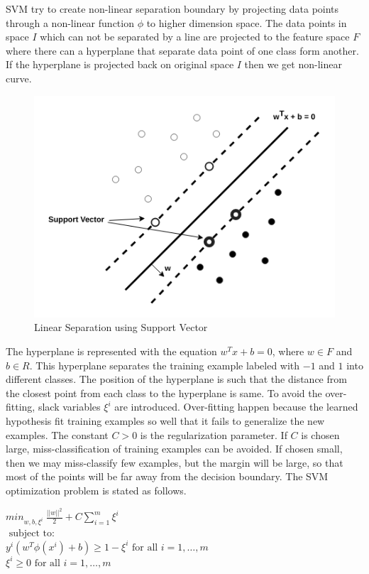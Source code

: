 \documentclass[12pt,oneside,a4paper]{article}
\begin{document}
SVM try to create non-linear separation boundary by projecting data points through a non-linear function $\phi$ to higher dimension space. The data points in space $I$ which can not be separated by a line are projected to the feature space $F$ where there can a hyperplane that separate data point of one class form another. If the hyperplane is projected back on original space $I$ then we get non-linear curve.\cite{svm}

\begin{figure}[H]
\centering
\includegraphics[scale=0.5]{SVM}
\caption{Linear Separation using Support Vector} \label{fig:SVM}
\end{figure}

The hyperplane is represented with the equation $w^{T}x + b = 0$, where $w \in F$ and $b \in R$. This hyperplane separates the training example labeled with $-1$ and $1$ into different classes. The position of the hyperplane is such that the distance from the closest point from each class to the hyperplane is same. To avoid the over-fitting, slack variables $\xi^{i}$ are introduced. Over-fitting happen because the learned hypothesis fit training examples so well that it fails to generalize the new examples. The constant $C > 0$ is the regularization parameter. If $C$ is chosen large, miss-classification of training examples can be avoided. If chosen small, then we may miss-classify few examples, but the margin will be large, so that most of the points will be far away from the decision boundary. The SVM optimization problem is stated as follows.\cite{svm} \cite{svm-ml}

\begin{center}
  ${min}_{w,b,\xi^i} \ \frac{||w||^2}{2} + C \sum_{i=1}^m \xi^i$ \\
  $\mbox{ subject to: }$ \\
  $y^i( w^T \phi(x^i) + b) \geq 1 - \xi^i \mbox{ for all } i = 1, \dots, m$ \\
  \hspace{3cm} $\xi^i \geq 0 \mbox{ for all } i = 1, \dots, m$ \\
\end{center}
\end{document}
